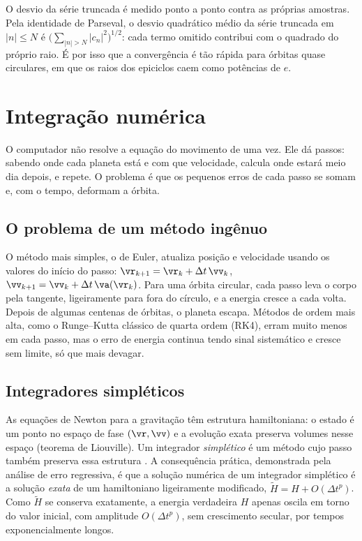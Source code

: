 O desvio da série truncada é medido ponto a ponto contra as próprias amostras. Pela identidade de Parseval, o desvio quadrático médio da série truncada em $|n|\leq N$ é $\bigl(\sum_{|n|>N}|c_n|^2\bigr)^{1/2}$: cada termo omitido contribui com o quadrado do próprio raio. É por isso que a convergência é tão rápida para órbitas quase circulares, em que os raios dos epiciclos caem como potências de $e$.

\section{Integração numérica}\label{sec:integradores}

\begin{paracomecar}
O computador não resolve a equação do movimento de uma vez. Ele dá passos: sabendo onde cada planeta está e com que velocidade, calcula onde estará meio dia depois, e repete. O problema é que os pequenos erros de cada passo se somam e, com o tempo, deformam a órbita.
\end{paracomecar}

\subsection{O problema de um método ingênuo}

O método mais simples, o de Euler, atualiza posição e velocidade usando os valores do início do passo: $\vr_{k+1} = \vr_k + \Delta t\,\vv_k$, $\vv_{k+1} = \vv_k + \Delta t\,\va(\vr_k)$. Para uma órbita circular, cada passo leva o corpo pela tangente, ligeiramente para fora do círculo, e a energia cresce a cada volta. Depois de algumas centenas de órbitas, o planeta escapa. Métodos de ordem mais alta, como o Runge--Kutta clássico de quarta ordem (RK4), erram muito menos em cada passo, mas o erro de energia continua tendo sinal sistemático e cresce sem limite, só que mais devagar.

\subsection{Integradores simpléticos}

As equações de Newton para a gravitação têm estrutura hamiltoniana: o estado é um ponto no espaço de fase $(\vr,\vv)$ e a evolução exata preserva volumes nesse espaço (teorema de Liouville). Um integrador \emph{simplético} é um método cujo passo também preserva essa estrutura \cite{hairer2006}. A consequência prática, demonstrada pela análise de erro regressiva, é que a solução numérica de um integrador simplético é a solução \emph{exata} de um hamiltoniano ligeiramente modificado, $\tilde H = H + O(\Delta t^p)$. Como $\tilde H$ se conserva exatamente, a energia verdadeira $H$ apenas oscila em torno do valor inicial, com amplitude $O(\Delta t^p)$, sem crescimento secular, por tempos exponencialmente longos.


